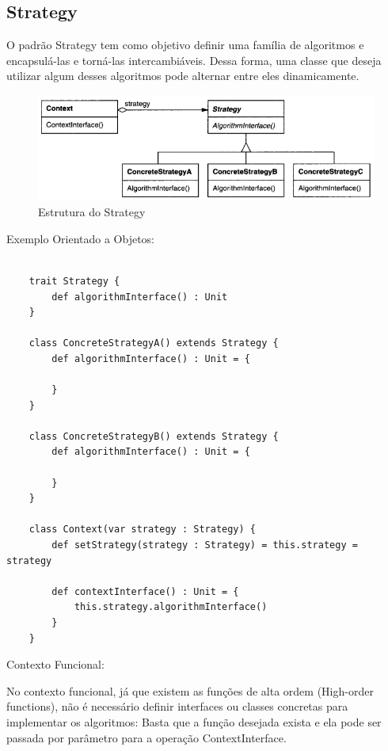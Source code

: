 \subsection{Strategy}

O padrão Strategy tem como objetivo definir uma família de 
algoritmos e encapsulá-las e torná-las intercambiáveis. Dessa 
forma, uma classe que deseja utilizar algum desses algoritmos 
pode alternar entre eles dinamicamente.

\begin{figure}[htb]
	\caption{\label{fig_grafico}Estrutura do Strategy}
	\begin{center}
	    \includegraphics[scale=0.5]{5_padroes-contexto-funcional/5.3_comportamentais/5.3.9_strategy/diagram.png}
	\end{center}
\end{figure}

Exemplo Orientado a Objetos:

\begin{lstlisting}[caption={Strategy Orientação a Objetos},label=oostrategy]
    
    trait Strategy {
        def algorithmInterface() : Unit
    }

    class ConcreteStrategyA() extends Strategy {
        def algorithmInterface() : Unit = {

        }
    }

    class ConcreteStrategyB() extends Strategy {
        def algorithmInterface() : Unit = {

        }
    }

    class Context(var strategy : Strategy) {
        def setStrategy(strategy : Strategy) = this.strategy = strategy

        def contextInterface() : Unit = {
            this.strategy.algorithmInterface()
        }
    }

\end{lstlisting}

Contexto Funcional:

No contexto funcional, já que existem as funções de alta 
ordem (High-order functions), não é necessário definir 
interfaces ou classes concretas para implementar os 
algoritmos: Basta que a função desejada exista e ela 
pode ser passada por parâmetro para a operação 
ContextInterface.

